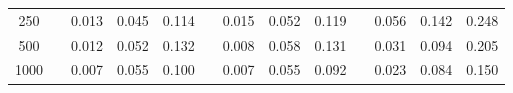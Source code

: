 % 
\begin{tabular}{ccccccccccccc}
  \hline
  \hline
250 &  & 0.013 & 0.045 & 0.114 &  & 0.015 & 0.052 & 0.119 &  & 0.056 & 0.142 & 0.248 \\ 
  500 &  & 0.012 & 0.052 & 0.132 &  & 0.008 & 0.058 & 0.131 &  & 0.031 & 0.094 & 0.205 \\ 
  1000 &  & 0.007 & 0.055 & 0.100 &  & 0.007 & 0.055 & 0.092 &  & 0.023 & 0.084 & 0.150 \\ 
   \hline
\end{tabular}
